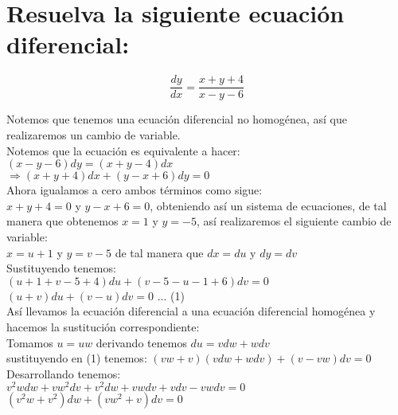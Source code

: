 \section{Resuelva la siguiente ecuación diferencial:}

\begin{equation*}
    \frac{dy}{dx}= \frac{x+y+4}{x-y-6}
\end{equation*}

Notemos que tenemos una ecuación diferencial no homogénea, así que realizaremos un cambio de variable.\\

Notemos que la ecuación es equivalente a hacer:\\

$(x-y-6)dy= (x+y-4)dx$\\

$\Rightarrow (x+y+4)dx + (y-x+6)dy= 0$\\ 

Ahora igualamos a cero ambos términos como sigue:\\

$x+y+4= 0$ y $y-x+6=0$, obteniendo así un sistema de ecuaciones, de tal manera que obtenemos $x=1$ y $y=-5$, así realizaremos el siguiente cambio de variable:\\

$x=u+1$ y $y= v-5$ de tal manera que $dx=du$ y $dy=dv$\\

Sustituyendo tenemos:\\

$(u+1+v-5+4)du + (v-5-u-1+6)dv= 0$\\

$(u+v)du + (v-u)dv=0$ ... (1)\\

Así llevamos la ecuación diferencial a una ecuación diferencial homogénea y hacemos la sustitución correspondiente:\\

Tomamos $u=uw$ derivando tenemos $du= v dw + w dv$\\

sustituyendo en (1) tenemos: $(vw + v)(v dw + w dv)+ (v- vw)dv= 0$\\

Desarrollando tenemos:\\

$v^{2}w dw + v w^{2} dv + v^{2} dw + vw dv + v dv - vw dv= 0$\\

$(v^{2} w + v^{2})dw + (vw^{2} + v)dv= 0$\\
    
